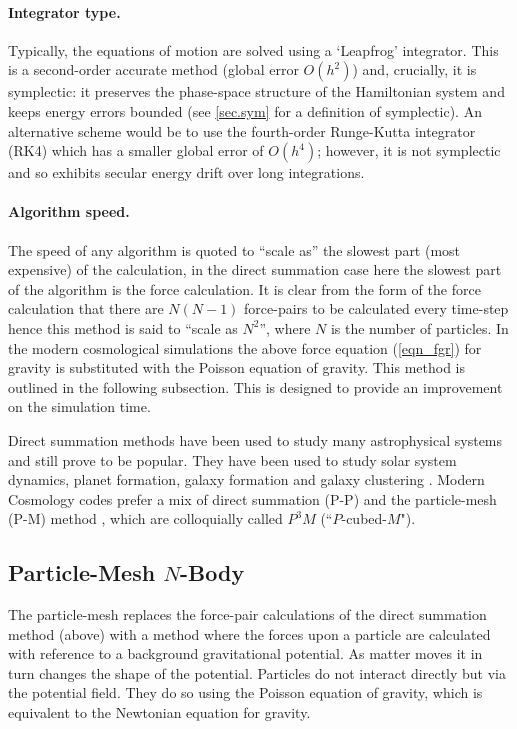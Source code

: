 \paragraph{Integrator type.} Typically, the equations of motion are solved using a `Leapfrog' integrator. This is a second-order accurate method (global error $O(h^2)$) and, crucially, it is symplectic: it preserves the phase-space structure of the Hamiltonian system and keeps energy errors bounded (see \ref{sec.sym} for a definition of symplectic). An alternative scheme would be to use the fourth-order Runge-Kutta integrator (RK4) which has a smaller global error of $O(h^4)$; however, it is not symplectic and so exhibits secular energy drift over long integrations. \citep{bib_nr}

\paragraph{Algorithm speed.} The speed of any algorithm is quoted to ``scale as'' the slowest part (most expensive) of the calculation, in the direct summation case here the slowest part of the algorithm is the force calculation. It is clear from the form of the force calculation that there are $N (N-1)$ force-pairs to be calculated every time-step hence this method is said to ``scale as $N^2$'', where $N$ is the number of particles. In the modern cosmological simulations the above force equation (\ref{eqn_fgr}) for gravity is substituted with the Poisson equation of gravity. This method is outlined in the following subsection. This is designed to provide an improvement on the simulation time.

Direct summation methods have been used to study many astrophysical systems and still prove to be popular. They have been used to study solar system dynamics, planet formation, galaxy formation and galaxy clustering \citep{bib_quin, bib_aar}. Modern Cosmology codes prefer a mix of direct summation (P-P) and the particle-mesh (P-M) method \citep{bib_bert, bib_hmpc}, which are colloquially called $P^3 M$ (``$P$-cubed-$M$").

\subsection{Particle-Mesh $N$-Body}
\label{sec.mesh}
The particle-mesh replaces the force-pair calculations of the direct summation method (above) with a method where the forces upon a particle are calculated with reference to a background gravitational potential. As matter moves it in turn changes the shape of the potential. Particles do not interact directly but via the potential field. They do so using the Poisson equation of gravity, which is equivalent to the Newtonian equation for gravity.


